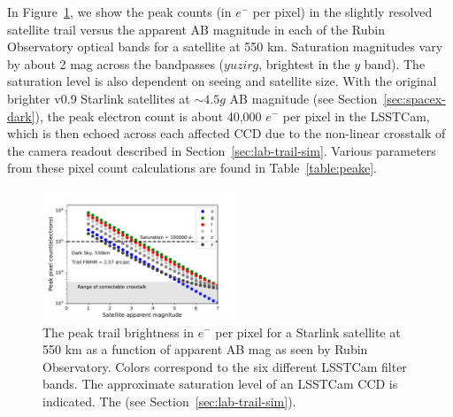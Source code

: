 \documentclass[twocolumn,trackchanges]{aastex63}
\begin{document}
In Figure~\ref{fig:peakesim550}, we show the peak counts (in $e^-$ per pixel) in the slightly resolved satellite trail versus the apparent AB magnitude in each of the Rubin Observatory optical bands for a satellite at 550 km. Saturation magnitudes vary by about 2 mag across the bandpasses ($yuzirg$, brightest in the $y$ band). The saturation level is also dependent on seeing and satellite size.
With the original brighter v0.9 Starlink satellites at $\sim4.5 g$ AB magnitude (see Section~\ref{sec:spacex-dark}), the peak electron count is about 40,000 $e^-$ per pixel in the LSSTCam, which is then echoed across each affected CCD due to the non-linear crosstalk of the camera readout described in  Section~\ref{sec:lab-trail-sim}.
Various parameters from these pixel count calculations are found in Table~\ref{table:peake}.
\begin{figure}[ht]
\includegraphics[width=0.52\textwidth]{Peak_count_by_band_550km_darkSky.pdf}
\caption{The peak trail brightness in $e^-$ per pixel for a Starlink satellite at 550 km as a function of apparent AB mag as seen by Rubin Observatory. Colors correspond to the six different LSSTCam filter bands. The approximate saturation level of an LSSTCam CCD is indicated. The  (see Section~\ref{sec:lab-trail-sim}). \label{fig:peakesim550}}
\end{figure}
\end{document}
